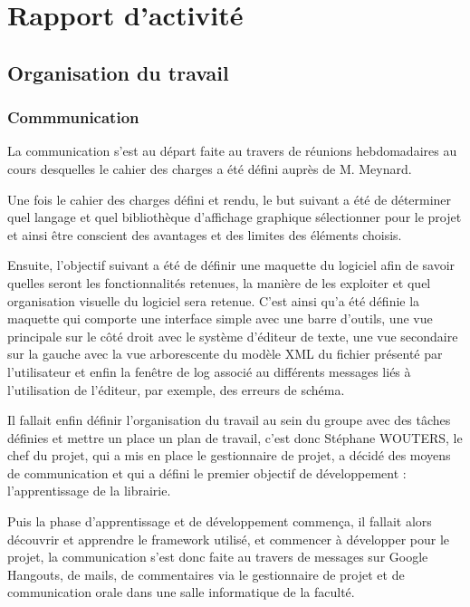 \chapter{Rapport d'activité}

\section{Organisation du travail}
        
\subsection{Commmunication}

        La communication s'est au départ faite au travers de réunions hebdomadaires au cours desquelles le cahier des charges a été défini auprès de M. Meynard.
        
        Une fois le cahier des charges défini et rendu, le but suivant a été de déterminer quel langage et quel bibliothèque d'affichage graphique sélectionner pour le projet et ainsi être conscient des avantages et des limites des éléments choisis.
        
        Ensuite, l'objectif suivant a été de définir une maquette du logiciel afin de savoir quelles seront les fonctionnalités retenues, la manière de les exploiter et quel organisation visuelle du logiciel sera retenue. C'est ainsi qu'a été définie la maquette qui comporte une interface simple avec une barre d'outils, une vue principale sur le côté droit avec le système d'éditeur de texte, une vue secondaire sur la gauche avec la vue arborescente du modèle XML du fichier présenté par l'utilisateur et enfin la fenêtre de log associé au différents messages liés à l'utilisation de l'éditeur, par exemple, des erreurs de schéma.
        
        Il fallait enfin définir l'organisation du travail au sein du groupe avec des tâches définies et mettre un place un plan de travail, c'est donc Stéphane WOUTERS, le chef du projet, qui a mis en place le gestionnaire de projet, a décidé des moyens de communication et qui a défini le premier objectif de développement : l'apprentissage de la librairie.
        
        Puis la phase d'apprentissage et de développement commença, il fallait alors découvrir et apprendre le framework utilisé, et commencer à développer pour le projet, la communication s'est donc faite au travers de messages sur Google Hangouts, de mails, de commentaires via le gestionnaire de projet et de communication orale dans une salle informatique de la faculté.
        
